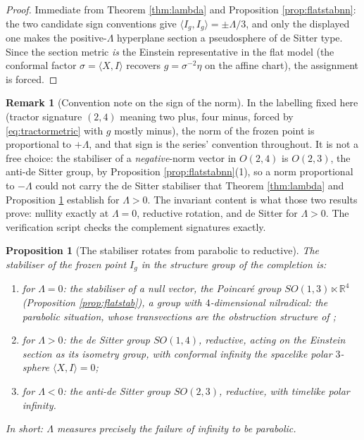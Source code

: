 \documentclass[11pt]{article}
\newtheorem{proposition}[theorem]{Proposition}
\theoremstyle{definition}
\newtheorem{remark}[theorem]{Remark}
\newcommand{\R}{\mathbb{R}}
\newcommand{\ip}[2]{\langle #1, #2\rangle}
\begin{document}
\begin{proof}
Immediate from Theorem \ref{thm:lambda} and Proposition \ref{prop:flatstabnn}: the two candidate sign conventions give $\ip{I_g}{I_g} = \pm\Lambda/3$, and only the displayed one makes the positive-$\Lambda$ hyperplane section a pseudosphere of de Sitter type. Since the section metric \emph{is} the Einstein representative in the flat model (the conformal factor $\sigma = \ip{X}{I}$ recovers $g = \sigma^{-2}\eta$ on the affine chart), the assignment is forced.
\end{proof}

\begin{remark}[Convention note on the sign of the norm]\label{rem:signZD}
In the labelling fixed here (tractor signature $(2,4)$ meaning two plus, four minus, forced by \eqref{eq:tractormetric} with $g$ mostly minus), the norm of the frozen point is proportional to $+\Lambda$, and that sign is the series' convention throughout. It is not a free choice: the stabiliser of a \emph{negative}-norm vector in $O(2,4)$ is $O(2,3)$, the anti-de Sitter group, by Proposition \ref{prop:flatstabnn}(1), so a norm proportional to $-\Lambda$ could not carry the de Sitter stabiliser that Theorem \ref{thm:lambda} and Proposition \ref{prop:stabiliser} establish for $\Lambda > 0$. The invariant content is what those two results prove: nullity exactly at $\Lambda = 0$, reductive rotation, and de Sitter for $\Lambda > 0$. The verification script checks the complement signatures exactly.
\end{remark}

\begin{proposition}[The stabiliser rotates from parabolic to reductive]\label{prop:stabiliser}
The stabiliser of the frozen point $I_g$ in the structure group of the completion is:
\begin{enumerate}
\item for $\Lambda = 0$: the stabiliser of a null vector, the Poincar\'e group $SO(1,3) \ltimes \R^4$ (Proposition \ref{prop:flatstab}), a group with $4$-dimensional nilradical: the parabolic situation, whose transvections are the obstruction structure of \cite{ButlerT1};
\item for $\Lambda > 0$: the de Sitter group $SO(1,4)$, reductive, acting on the Einstein section as its isometry group, with conformal infinity the spacelike polar $3$-sphere $\ip{X}{I} = 0$;
\item for $\Lambda < 0$: the anti-de Sitter group $SO(2,3)$, reductive, with timelike polar infinity.
\end{enumerate}
In short: $\Lambda$ measures precisely the failure of infinity to be parabolic.
\end{proposition}
\end{document}

